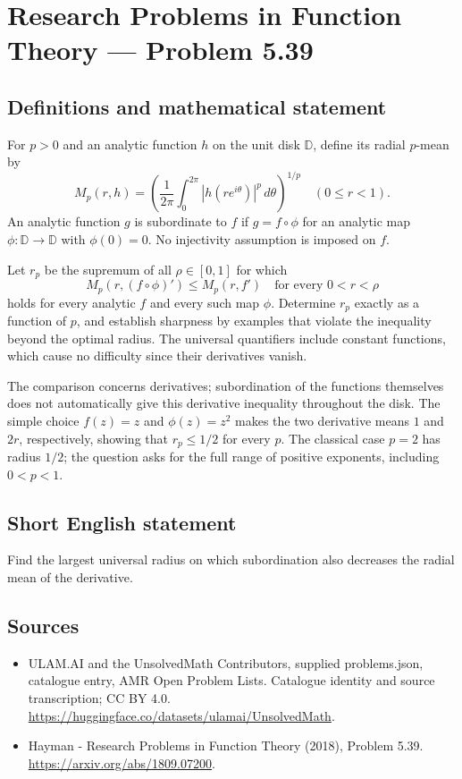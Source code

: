 \documentclass[11pt,a4paper]{article}
\begin{document}
\section*{Research Problems in Function Theory — Problem 5.39}\label{statement}

\subsection{Definitions and mathematical statement}
For $p>0$ and an analytic function $h$ on the unit disk
$\mathbb D$, define its radial $p$-mean by
\[
 M_p(r,h)=\left(\frac1{2\pi}\int_0^{2\pi}
                     |h(re^{i\theta})|^p\,d\theta\right)^{1/p}
 \quad(0\leq r<1).
\]
An analytic function $g$ is subordinate to $f$ if
$g=f\circ\phi$ for an analytic map $\phi:\mathbb D\to\mathbb D$
with $\phi(0)=0$. No injectivity assumption is imposed on $f$.

Let $r_p$ be the supremum of all $\rho\in[0,1]$ for which
\[
 M_p(r,(f\circ\phi)')\leq M_p(r,f')
 \quad\text{for every }0<r<\rho
\]
holds for every analytic $f$ and every such map $\phi$.
Determine $r_p$ exactly as a function of $p$, and establish
sharpness by examples that violate the inequality beyond the
optimal radius. The universal quantifiers include constant
functions, which cause no difficulty since their derivatives vanish.

The comparison concerns derivatives; subordination of the functions
themselves does not automatically give this derivative inequality
throughout the disk. The simple choice $f(z)=z$ and $\phi(z)=z^2$
makes the two derivative means $1$ and $2r$, respectively,
showing that $r_p\leq1/2$ for every $p$. The classical case
$p=2$ has radius $1/2$; the question asks for the full range
of positive exponents, including $0<p<1$.
\subsection{Short English statement}
Find the largest universal radius on which subordination also decreases the radial mean of the derivative.
\subsection{Sources}
\begin{itemize}
\item[S1] ULAM.AI and the UnsolvedMath Contributors, supplied problems.json, catalogue entry, AMR Open Problem Lists. Catalogue identity and source transcription; CC BY 4.0.
\url{https://huggingface.co/datasets/ulamai/UnsolvedMath}.
\item[S2] Hayman - Research Problems in Function Theory (2018), Problem 5.39. 
\url{https://arxiv.org/abs/1809.07200}.
\end{itemize}
\end{document}
